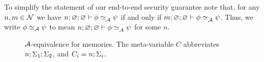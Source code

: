 To simplify the statement of our end-to-end security guarantee note that, for any $n, m \in \mathcal{N}$ we have $\loweq{n; \emptyenv; \emptyenv}{\Attacker}{\store}{\altstore}$ if and only if $\loweq{m; \emptyenv; \emptyenv}{\Attacker}{\store}{\altstore}$. Thus, we write $\phi \simeq_{\mathcal{A}} \psi$ to mean $\loweq{n; \emptyenv; \emptyenv}{\Attacker}{\store}{\altstore}$ for some $n$.

\begin{figure}
    \centering
    \caption{$\mathcal{A}$-equivalence for memories. The meta-variable $C$ abbreviates $n; \Sigma_1; \Sigma_2$, and $C_i = n; \Sigma_i$.}
    \label{fig:low-eq-memories}
\end{figure}

